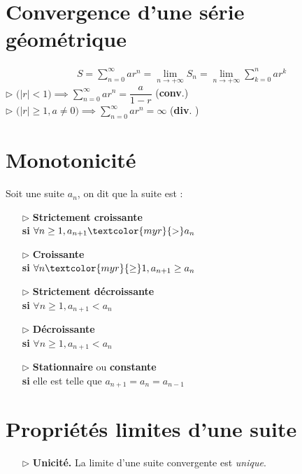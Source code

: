 \documentclass{report}
\begin{document}
\begin{multicols*}{3}
    \section{Convergence d'une série géométrique}
    \begin{align*}
        S = \sum\limits_{n=0}^{\infty}ar^n = \lim\limits_{n \to+\infty }S_n = 
        \lim\limits_{n \to+\infty } \sum\limits_{k=0}^{n}ar^k 
    \end{align*}
        \noindent$\rhd$ 
            $\Big(|r| < 1\big) \implies  
            \sum_{n=0}^{\infty }ar^{n} = 
            \dfrac{a}{1 - r} $ \;\;(\textbf{\textcolor{myb}{conv}}.)  
        \\
        $\rhd$ 
            $\bigl(|r| \geq 1, a \neq 0\bigr) \implies 
            \sum_{n=0}^{\infty }ar^{n} = \infty$ 
            (\textbf{\textcolor{myr}{div}}. )   


    \section{Monotonicité} 
    Soit une suite $a_n$, on dit que la suite est : 
    \begin{itemize} 
        \item[$\rhd$ ] \textbf{Strictement croissante} 
            \\ \textbf{si} $\forall n \geq 1, a_{n+1} \textcolor{myr}{>} a_n$         
        \item[$\rhd$ ] \textbf{Croissante} \\ 
            \textbf{si} $\forall n \textcolor{myr}{\geq} 1, a_{n+1} \geq a_n$         
        \item[$\rhd$ ] \textbf{Strictement décroissante} \\ 
            \textbf{si} $\forall n \geq 1, a_{n+1} < a_n$ 
        \item[$\rhd$ ] \textbf{Décroissante} \\ 
            \textbf{si} $\forall n \geq 1, a_{n+1} < a_n$ 
        \item[$\rhd$ ] \textbf{Stationnaire} ou \textbf{constante} \\ 
            \textbf{si} elle est telle que $a_{n+1} = a_n = a_{n-1}$
    \end{itemize}

    \section{Propriétés limites d'une suite}
    \begin{itemize}
        \item[$\rhd$] \textbf{Unicité.} La limite d'une suite convergente est \textit{unique}.
        

\end{itemize}
\end{multicols*}
\end{document}

